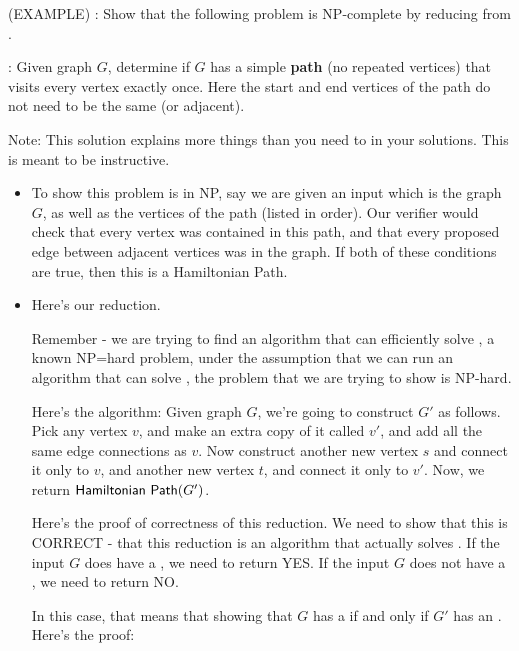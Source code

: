\begin{questions}
\begin{parts}
  \end{parts}

  \question (EXAMPLE) \HP: 
  Show that the following problem is NP-complete by reducing from \HC.

  \HP: Given graph $G$, determine if $G$ has a simple {\bf path} (no repeated
  vertices) that visits every vertex exactly once. Here the start and end
  vertices of the path do not need to be the same (or adjacent).
  \begin{solution}
    Note: This solution explains more things than you need to in your
    solutions. This is meant to be instructive.

    \begin{itemize}
      \item To show this problem is in NP, say we are given an input which is
        the graph $G$, as well as the vertices of the path (listed in order).
        Our verifier would check that every vertex was contained in this path,
        and that every proposed edge between adjacent vertices was in the
        graph. If both of these conditions are true, then this is a
        Hamiltonian Path.

      \item 

        Here's our reduction.

        Remember - we are trying to find an algorithm that can efficiently
        solve \HC, a known NP=hard problem, under the assumption that we can
        run an algorithm that can solve \HP, the problem that we are trying to
        show is NP-hard.

        Here's the algorithm:
        Given graph $G$, we're going to construct $G'$ as follows. Pick any
        vertex $v$, and make an extra copy of it called $v'$, and add all the
        same edge connections as $v$.  Now construct another new vertex $s$
        and connect it only to $v$, and another new vertex $t$, and connect it
        only to $v'$. Now, we return $\mathsf{Hamiltonian\ Path}(G')$.

        Here's the proof of correctness of this reduction. We need to show
        that this is CORRECT - that this reduction is an
        algorithm that actually solves \HC. 
        If the input $G$ does have a \HC, we need to return YES. If the input
        $G$ does not have a \HC, we need to return NO.
        
        In this case, that means that showing that $G$ has a \HC if and only
        if $G'$ has an \HP. Here's the proof:


\end{itemize}
\end{solution}
\end{questions}
